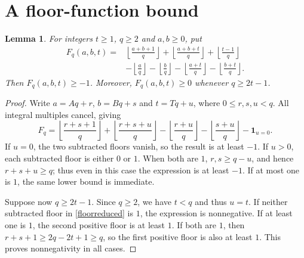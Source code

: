 \documentclass[11pt]{article}
\newtheorem{lemma}{Lemma}
\begin{document}
\section*{A floor-function bound}
\begin{lemma}\label{floor}
For integers $t\ge1$, $q\ge2$ and $a,b\ge0$, put
\begin{align*}
 F_q(a,b,t)={}&
 \left\lfloor\frac{a+b+1}{q}\right\rfloor+
 \left\lfloor\frac{a+b+t}{q}\right\rfloor+
 \left\lfloor\frac{t-1}{q}\right\rfloor\\
 &-\left\lfloor\frac a q\right\rfloor
 -\left\lfloor\frac b q\right\rfloor
 -\left\lfloor\frac{a+t}{q}\right\rfloor
 -\left\lfloor\frac{b+t}{q}\right\rfloor.
\end{align*}
Then $F_q(a,b,t)\ge-1$. Moreover, $F_q(a,b,t)\ge0$ whenever
$q\ge2t-1$.
\end{lemma}
\begin{proof}
Write $a=Aq+r$, $b=Bq+s$ and $t=Tq+u$, where $0\le r,s,u<q$.
All integral multiples cancel, giving
\begin{equation}\label{floorreduced}
 F_q=\left\lfloor\frac{r+s+1}{q}\right\rfloor+
 \left\lfloor\frac{r+s+u}{q}\right\rfloor-
 \left\lfloor\frac{r+u}{q}\right\rfloor-
 \left\lfloor\frac{s+u}{q}\right\rfloor-\mathbf1_{u=0}.
\end{equation}
If $u=0$, the two subtracted floors vanish, so the result is at least
$-1$. If $u>0$, each subtracted floor is either $0$ or $1$.
When both are $1$, $r,s\ge q-u$, and hence $r+s+u\ge q$;
thus even in this case the expression is at least $-1$.
If at most one is $1$, the same lower bound is immediate.

Suppose now $q\ge2t-1$. Since $q\ge2$, we have $t<q$ and thus $u=t$.
If neither subtracted floor in \eqref{floorreduced} is $1$, the
expression is nonnegative. If at least one is $1$, the second positive
floor is at least $1$. If both are $1$, then
$r+s+1\ge2q-2t+1\ge q$, so the first positive floor is also at least
$1$. This proves nonnegativity in all cases.
\end{proof}
\end{document}
